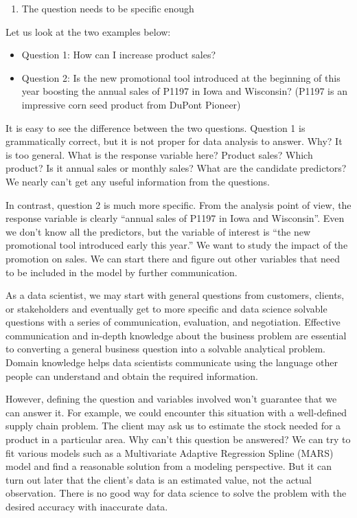 \documentclass[12pt,]{krantz}
\providecommand{\tightlist}{%
  \setlength{\itemsep}{0pt}\setlength{\parskip}{0pt}}
\begin{document}
\begin{enumerate}
\def\labelenumi{\arabic{enumi}.}
\tightlist
\item
  The question needs to be specific enough
\end{enumerate}

Let us look at the two examples below:

\begin{itemize}
\tightlist
\item
  Question 1: How can I increase product sales?
\item
  Question 2: Is the new promotional tool introduced at the beginning of this year boosting the annual sales of P1197 in Iowa and Wisconsin? (P1197 is an impressive corn seed product from DuPont Pioneer)
\end{itemize}

It is easy to see the difference between the two questions. Question 1 is grammatically correct, but it is not proper for data analysis to answer. Why? It is too general. What is the response variable here? Product sales? Which product? Is it annual sales or monthly sales? What are the candidate predictors? We nearly can't get any useful information from the questions.

In contrast, question 2 is much more specific. From the analysis point of view, the response variable is clearly ``annual sales of P1197 in Iowa and Wisconsin''. Even we don't know all the predictors, but the variable of interest is ``the new promotional tool introduced early this year.'' We want to study the impact of the promotion on sales. We can start there and figure out other variables that need to be included in the model by further communication.

As a data scientist, we may start with general questions from customers, clients, or stakeholders and eventually get to more specific and data science solvable questions with a series of communication, evaluation, and negotiation. Effective communication and in-depth knowledge about the business problem are essential to converting a general business question into a solvable analytical problem. Domain knowledge helps data scientists communicate using the language other people can understand and obtain the required information.

However, defining the question and variables involved won't guarantee that we can answer it. For example, we could encounter this situation with a well-defined supply chain problem. The client may ask us to estimate the stock needed for a product in a particular area. Why can't this question be answered? We can try to fit various models such as a Multivariate Adaptive Regression Spline (MARS) model and find a reasonable solution from a modeling perspective. But it can turn out later that the client's data is an estimated value, not the actual observation. There is no good way for data science to solve the problem with the desired accuracy with inaccurate data.
\end{document}
